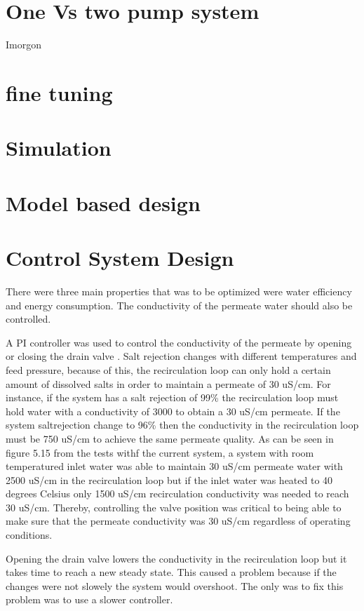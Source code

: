 \section{One Vs two pump system}

Imorgon

\section{fine tuning}



\section{Simulation}

\section{Model based design}

\section{Control System Design}

There were three main properties that was to be optimized were water efficiency and energy consumption. The conductivity of the permeate water should also be controlled.

A PI controller was used to control the conductivity of the permeate by opening or closing the drain valve . Salt rejection changes with different temperatures and feed pressure, because of this, the recirculation loop can only hold a certain amount of dissolved salts in order to maintain a permeate of 30 uS/cm. For instance, if the system has a salt rejection of 99\% the recirculation loop must hold water with a conductivity of 3000 to obtain a 30 uS/cm permeate. If the system saltrejection change to 96\% then the conductivity in the recirculation loop must be 750 uS/cm to achieve the same permeate quality. As can be seen in figure 5.15 from the tests withf the current system, a system with room temperatured inlet water was able to maintain 30 uS/cm permeate water with 2500 uS/cm in the recirculation loop but if the inlet water was heated to 40 degrees Celsius only 1500 uS/cm recirculation conductivity was needed to reach 30 uS/cm. Thereby, controlling the valve position was critical to being able to make sure that the permeate conductivity was 30 uS/cm regardless of operating conditions. 

Opening the drain valve lowers the conductivity in the recirculation loop but it takes time to reach a new steady state. This caused a problem because if the changes were not slowely the system would overshoot. The only was to fix this problem was to use a slower controller.

